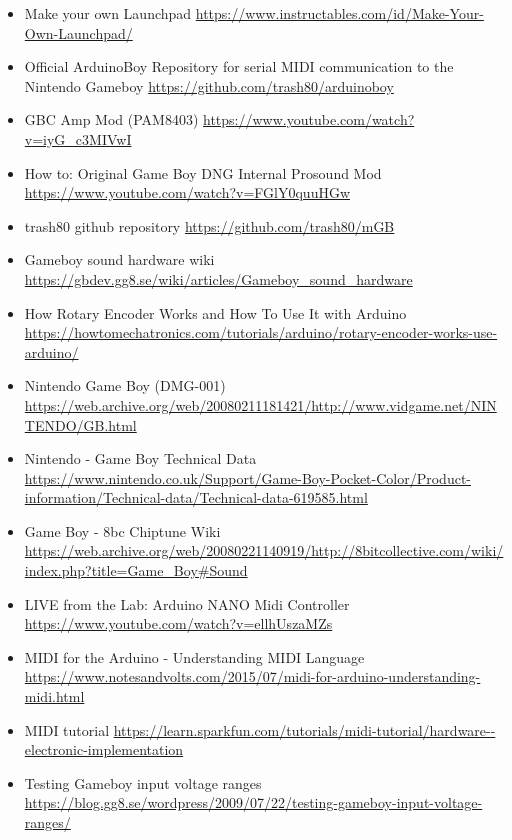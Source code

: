 \documentclass{article}
\begin{document}
\begin{itemize}

        \item Make your own Launchpad
                \url{https://www.instructables.com/id/Make-Your-Own-Launchpad/}

        \item Official ArduinoBoy Repository for serial MIDI communication to the Nintendo Gameboy 
                \url{https://github.com/trash80/arduinoboy}

        \item GBC Amp Mod (PAM8403)
                \url{https://www.youtube.com/watch?v=iyG_c3MIVwI}
        
        \item How to: Original Game Boy DNG Internal Prosound Mod
                \url{https://www.youtube.com/watch?v=FGlY0quuHGw}

        \item trash80 github repository 
                \url{https://github.com/trash80/mGB }
            
        \item Gameboy sound hardware wiki
                \url{https://gbdev.gg8.se/wiki/articles/Gameboy_sound_hardware}

        \item How Rotary Encoder Works and How To Use It with Arduino
                \url{https://howtomechatronics.com/tutorials/arduino/rotary-encoder-works-use-arduino/}

        \item Nintendo Game Boy (DMG-001)
                \url{https://web.archive.org/web/20080211181421/http://www.vidgame.net/NINTENDO/GB.html}

        \item Nintendo - Game Boy Technical Data
                \url{https://www.nintendo.co.uk/Support/Game-Boy-Pocket-Color/Product-information/Technical-data/Technical-data-619585.html}

        \item Game Boy - 8bc Chiptune Wiki
                \url{https://web.archive.org/web/20080221140919/http://8bitcollective.com/wiki/index.php?title=Game_Boy#Sound}
    
        \item LIVE from the Lab: Arduino NANO Midi Controller
                \url{https://www.youtube.com/watch?v=ellhUszaMZs}

        \item MIDI for the Arduino - Understanding MIDI Language
                \url{https://www.notesandvolts.com/2015/07/midi-for-arduino-understanding-midi.html}

        \item MIDI tutorial
                \url{https://learn.sparkfun.com/tutorials/midi-tutorial/hardware--electronic-implementation}

        \item Testing Gameboy input voltage ranges
                \url{https://blog.gg8.se/wordpress/2009/07/22/testing-gameboy-input-voltage-ranges/}
                

\end{itemize}
\end{document}
